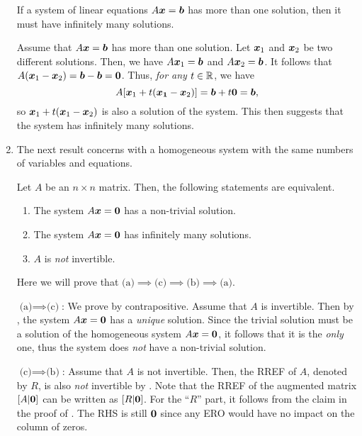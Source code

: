\begin{enumerate}
\begin{proposition}
\label{prp:sle-more-than-one-sol-inf}
If a system of linear equations \(A\vb*{x}=\vb*{b}\) has more than one
solution, then it must have infinitely many solutions.
\end{proposition}
\begin{pf}
Assume that \(A\vb*{x}=\vb*{b}\) has more than one solution. Let
\(\vb*{x}_1\) and \(\vb*{x}_2\) be two different solutions. Then, we have
\(A\vb*{x}_1=\vb*{b}\) and \(A\vb*{x}_2=\vb*{b}\). It follows that
\(A(\vb*{x}_1-\vb*{x}_2)=\vb*{b}-\vb*{b}=\vb*{0}\). Thus, \emph{for any}
\(t\in\mathbb{R}\), we have
\[
A[\vb*{x}_1+t(\vb*{x_1}-\vb*{x}_2)]
=\vb*{b}+t\vb*{0}
=\vb*{b},
\]
so \(\vb*{x}_1+t(\vb*{x}_1-\vb*{x}_2)\) is also a solution of the system.
This then suggests that the system has infinitely many solutions.
\end{pf}

\item The next result concerns with a homogeneous system with the same numbers
of variables and equations.

\begin{proposition}
\label{prp:homo-same-var-eqs-equiv}
Let \(A\) be an \(n\times n\) matrix. Then, the following statements are
equivalent.
\begin{enumerate}
\item The system \(A\vb*{x}=\vb*{0}\) has a non-trivial solution.
\item The system \(A\vb*{x}=\vb*{0}\) has infinitely many solutions.
\item \(A\) is \emph{not} invertible.
\end{enumerate}
\end{proposition}
\begin{pf}
Here we will prove that \(\text{(a)}\implies \text{(c)}\implies
\text{(b)}\implies \text{(a)}\).

\underline{\(\text{(a)}\implies \text{(c)}\)}: We prove by contrapositive.
Assume that \(A\) is invertible. Then by , the system
\(A\vb*{x}=\vb*{0}\) has a \emph{unique} solution. Since the trivial solution
must be a solution of the homogeneous system \(A\vb*{x}=\vb*{0}\), it follows
that it is the \emph{only} one, thus the system does \emph{not} have a
non-trivial solution.

\underline{\(\text{(c)}\implies\text{(b)}\)}: Assume that \(A\) is not
invertible. Then, the RREF of \(A\), denoted by \(R\), is also \emph{not} invertible
by . Note that the RREF of the augmented matrix
\([A|\vb*{0}]\) can be written as \([R|\vb*{0}]\). For the ``\(R\)'' part, it
follows from the claim in the proof of . The RHS is still
\(\vb*{0}\) since any ERO would have no impact on the column of zeros.


\end{pf}
\end{enumerate}
